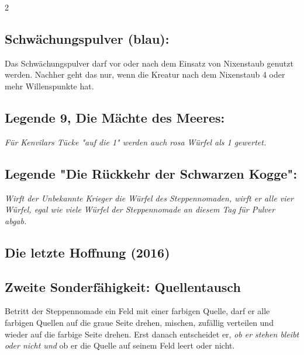 \documentclass[10pt, a4paper, oneside]{book}
\newcommand{\fan}[1]{\textit{#1}}
\begin{document}
\begin{multicols*}{2}
\begin{bgcolor}
\subsection{Schwächungspulver (blau):}

Das Schwächungspulver darf vor oder nach dem Einsatz von Nixenstaub genutzt werden. Nachher geht das nur, wenn die Kreatur nach dem Nixenstaub 4 oder mehr Willenspunkte hat.
\supercite{mh-begleitheft,88552}




\subsection{Legende 9, Die Mächte des Meeres:}

\fan{Für Kenvilars Tücke "auf die 1" werden auch rosa Würfel als 1 gewertet.}
\supercite{15179}


\subsection{Legende "Die Rückkehr der Schwarzen Kogge":}

\fan{Wirft der Unbekannte Krieger die Würfel des Steppennomaden, wirft er alle vier Würfel, egal wie viele Würfel der Steppennomade an diesem Tag für Pulver abgab.}

\end{bgcolor}



\columnbreak


\begin{bgcolor}
\section{Die letzte Hoffnung (2016)}




\subsection{Zweite Sonderfähigkeit: Quellentausch}

Betritt der Steppennomade ein Feld mit einer farbigen Quelle, darf er alle farbigen Quellen auf die graue Seite drehen, mischen, zufällig verteilen und wieder auf die farbige Seite drehen. Erst danach entscheidet er, \fan{ob er stehen bleibt oder nicht und} ob er die Quelle auf seinem Feld leert oder nicht.
\supercite{mh11-heldenkarte-steppennomade,94521}




\end{bgcolor}
\end{multicols*}
\end{document}
